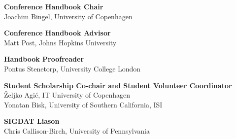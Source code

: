 {\bf Conference Handbook Chair}\\
Joachim Bingel, University of Copenhagen

{\bf Conference Handbook Advisor}\\
Matt Post, Johns Hopkins University

{\bf Handbook Proofreader}\\
Pontus Stenetorp, University College London

{\bf Student Scholarship Co-chair and Student Volunteer Coordinator}\\
Željko Agić, IT University of Copenhagen\\
Yonatan Bisk, University of Southern California, ISI

{\bf SIGDAT Liason}\\
Chris Callison-Birch, University of Pennsylvania
%
%
%
%
%
%
%
%
%
%

